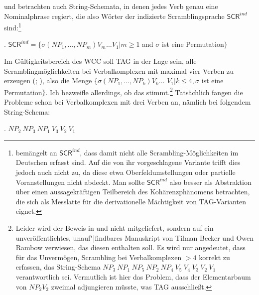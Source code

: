 \cite{Becker:Joshi:Rambow:91} und \cite{Joshi:Becker:Rambow:00} betrachten auch String-Schemata, in denen jedes Verb genau eine Nominalphrase regiert, die also Wörter der indizierte Scramblingsprache $\mathsf{SCR}^{ind}$ sind:\footnote{\citet[200]{Kallmeyer:05} bemängelt an  $\mathsf{SCR}^{ind}$, dass damit nicht alle Scrambling-Möglichkeiten im Deutschen erfasst sind. Auf die von ihr vorgeschlagene Variante trifft dies jedoch auch nicht zu, da diese etwa Oberfeldumstellungen oder partielle Voranstellungen nicht abdeckt. Man sollte $\mathsf{SCR}^{ind}$ also besser als Abstraktion über einen aussagekräftigen Teilbereich des Kohärenzphänomens betrachten, die sich als Messlatte für die derivationelle Mächtigkeit von TAG-Varianten eignet.}

\ex. $\mathsf{SCR}^{ind} = \{ \sigma(\mathit{NP}_1,\ldots,\mathit{NP}_m) V_m \ldots V_1 | m \geq 1$ and $\sigma$ ist eine Permuta\-tion$\}$ 

Im Gültigkeitsbereich des WCC soll TAG in der Lage sein, alle Scramblingmöglichkeiten bei Verbalkomplexen mit maximal vier Verben zu erzeugen (\citealt[23]{Becker:Joshi:Rambow:91}; \citealt[177]{Joshi:Becker:Rambow:00}), also die Menge $\{ \sigma(\mathit{NP}_1, \ldots, \mathit{NP}_k) V_k \ldots$ $V_1 | k \leq 4, \sigma$ ist eine Permuta\-tion$\}$. Ich bezweifle allerdings, ob das stimmt.\footnote{Leider wird der Beweis in \citet{Becker:Joshi:Rambow:91} und \citet{Joshi:Becker:Rambow:00} nicht mitgeliefert, sondern auf ein unveröffentlichtes, unauf"|findbares Manuskript von Tilman Becker und Owen Rambow verwiesen, das diesen enthalten soll. Es wird nur angedeutet, dass für das Unvermögen, Scrambling bei Verbalkomplexen $> 4$ korrekt zu erfassen, das String-Schema $\mathit{NP}_3 ~ \mathit{NP}_1 ~ \mathit{NP}_5 ~ \mathit{NP}_2 ~ \mathit{NP}_4 ~ V_5 ~ V_4 ~ V_3 ~ V_2 ~ V_1$ verantwortlich sei.  Vermutlich ist hier das Problem, dass der Elementarbaum von $\mathit{NP}_2 V_2$ zweimal adjungieren müsste, was TAG ausschlie\ss t.} Tatsächlich fangen die Probleme schon bei Verbalkomplexen mit drei Verben an, nämlich bei folgendem String-Schema:

\ex. $\mathit{NP}_2 ~ \mathit{NP}_3 ~ \mathit{NP}_1 ~ V_3 ~ V_2 ~ V_1$\label{ex-schema-231} 

